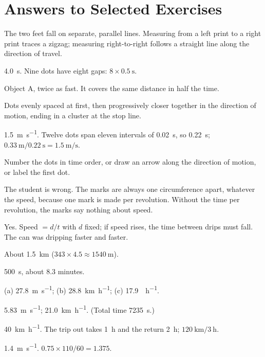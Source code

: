 \documentclass[11pt,twoside,openany]{book}
\begin{document}
\section*{Answers to Selected Exercises}
\begin{description}[leftmargin=2.6em,itemsep=3pt,style=sameline]
  \item[1.1] The two feet fall on separate, parallel lines. Measuring from a left print to a right print traces a zigzag; measuring right-to-right follows a straight line along the direction of travel.
  \item[1.2] \SI{4.0}{\second}. Nine dots have eight gaps: $8 \times \SI{0.5}{\second}$.
  \item[1.3] Object A, twice as fast. It covers the same distance in half the time.
  \item[1.4] Dots evenly spaced at first, then progressively closer together in the direction of motion, ending in a cluster at the stop line.
  \item[1.5] \SI{1.5}{\metre\per\second}. Twelve dots span eleven intervals of \SI{0.02}{\second}, so \SI{0.22}{\second}; $\SI{0.33}{\metre}/\SI{0.22}{\second} = \SI{1.5}{\metre\per\second}$.
  \item[1.6] Number the dots in time order, or draw an arrow along the direction of motion, or label the first dot.
  \item[1.7] The student is wrong. The marks are always one circumference apart, whatever the speed, because one mark is made per revolution. Without the time per revolution, the marks say nothing about speed.
  \item[1.8] Yes. Speed $= d/t$ with $d$ fixed; if speed rises, the time between drips must fall. The can was dripping faster and faster.
  \item[1.9] About \SI{1.5}{\kilo\metre} ($343 \times 4.5 \approx \SI{1540}{\metre}$).
  \item[1.10] \SI{500}{\second}, about \num{8.3} minutes.
  \item[1.11] (a) \SI{27.8}{\metre\per\second}; (b) \SI{28.8}{\kilo\metre\per\hour}; (c) \SI{17.9}{\mile\per\hour}.
  \item[1.12] \SI{5.83}{\metre\per\second}; \SI{21.0}{\kilo\metre\per\hour}. (Total time \SI{7235}{\second}.)
  \item[1.13] \SI{40}{\kilo\metre\per\hour}. The trip out takes \SI{1}{\hour} and the return \SI{2}{\hour}; $\SI{120}{\kilo\metre}/\SI{3}{\hour}$.
  \item[1.14] \SI{1.4}{\metre\per\second}. $0.75 \times 110 / 60 = 1.375$.

\end{description}
\end{document}
